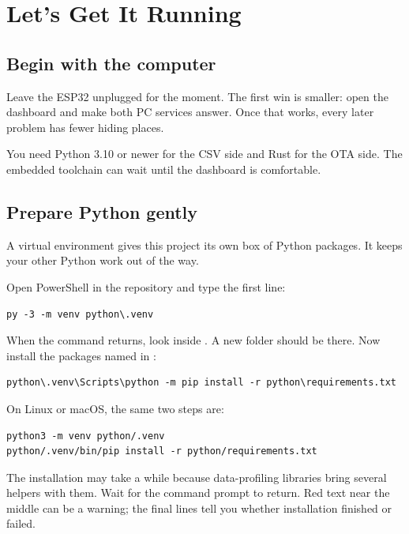 \chapter{Let's Get It Running}

\section{Begin with the computer}

Leave the ESP32 unplugged for the moment. The first win is smaller: open the dashboard and make both PC services answer. Once that works, every later problem has fewer hiding places.

You need Python 3.10 or newer for the CSV side and Rust for the OTA side. The embedded toolchain can wait until the dashboard is comfortable.

\section{Prepare Python gently}

A virtual environment gives this project its own box of Python packages. It keeps your other Python work out of the way.

Open PowerShell in the repository and type the first line:

\begin{lstlisting}
py -3 -m venv python\.venv
\end{lstlisting}

When the command returns, look inside . A new  folder should be there. Now install the packages named in :

\begin{lstlisting}
python\.venv\Scripts\python -m pip install -r python\requirements.txt
\end{lstlisting}

On Linux or macOS, the same two steps are:

\begin{lstlisting}
python3 -m venv python/.venv
python/.venv/bin/pip install -r python/requirements.txt
\end{lstlisting}

The installation may take a while because data-profiling libraries bring several helpers with them. Wait for the command prompt to return. Red text near the middle can be a warning; the final lines tell you whether installation finished or failed.

